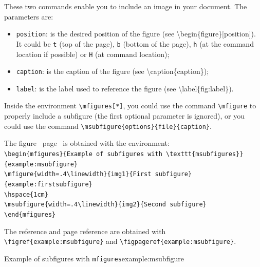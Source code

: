 \documentclass[book,taskpackage,specpackage,codepackage]{upmethodology-document}
\begin{document}
These two commands enable you to include an image in your document. The parameters are:
\begin{itemize}
\item \texttt{position}: is the desired position of the figure (see {\textbackslash}begin\{figure\}[position]). It could be \texttt{t} (top of the page), \texttt{b} (bottom of the page), \texttt{h} (at the command location if possible) or \texttt{H} (at command location);

\item \texttt{caption}: is the caption of the figure (see {\textbackslash}caption\{caption\});

\item \texttt{label}: is the label used to reference the figure (see {\textbackslash}label\{fig:label\}).
\end{itemize}

Inside the environment \texttt{{\textbackslash}mfigures[*]}, you could use the command \texttt{{\textbackslash}mfigure} to properly include a subfigure (the first optional parameter is ignored), or you could use the command \texttt{{\textbackslash}msubfigure\{options\}\{file\}\{caption\}}.

The figure~ page~ is obtained with the environment:\\
\texttt{{\textbackslash}begin\{mfigures\}\{Example of subfigures with {\textbackslash}texttt\{msubfigures\}\}\{example:msubfigure\}}\\
\texttt{{\textbackslash}mfigure\{width=.4{\textbackslash}linewidth\}\{img1\}\{First subfigure\}\{example:firstsubfigure\}} \\
\texttt{{\textbackslash}hspace\{1cm\}} \\
\texttt{{\textbackslash}msubfigure\{width=.4{\textbackslash}linewidth\}\{img2\}\{Second subfigure\}} \\
\texttt{{\textbackslash}end\{mfigures\}}

The reference and page reference are obtained with \texttt{{\textbackslash}figref\{example:msubfigure\}} and \texttt{{\textbackslash}figpageref\{example:msubfigure\}}.

\begin{mfigures}{Example of subfigures with \texttt{mfigures}}{example:msubfigure}
	\hspace{1cm}
\end{mfigures}
\end{document}
